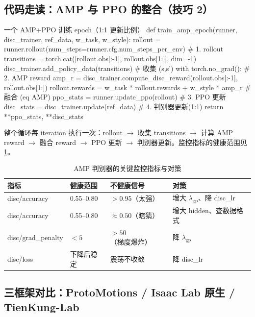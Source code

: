 \subsection{代码走读：AMP 与 PPO 的整合（技巧 2）}
\label{sec:rlmc-imit-amp-ppo}

\begin{codebox}[Python]{一个 AMP+PPO 训练 epoch（1:1 更新比例）}
def train_amp_epoch(runner, disc_trainer, ref_data, w_task, w_style):
    rollout = runner.rollout(num_steps=runner.cfg.num_steps_per_env)  # 1. rollout
    transitions = torch.cat([rollout.obs[:-1], rollout.obs[1:]], dim=-1)
    disc_trainer.add_policy_data(transitions)                          # 收集 (s,s')
    with torch.no_grad():                                              # 2. AMP reward
        amp_r = disc_trainer.compute_disc_reward(rollout.obs[:-1], rollout.obs[1:])
        rollout.rewards = w_task * rollout.rewards + w_style * amp_r   # 融合 (eq AMP)
    ppo_stats = runner.update_ppo(rollout)                            # 3. PPO 更新
    disc_stats = disc_trainer.update(ref_data)                        # 4. 判别器更新(1:1)
    return {**ppo_stats, **disc_stats}
\end{codebox}

整个循环每 iteration 执行一次：rollout $\to$ 收集 transitions $\to$ 计算 AMP reward $\to$ 融合 reward $\to$ PPO 更新 $\to$ 判别器更新。监控指标的健康范围见 \cref{tab:rlmc-imit-discmonitor}。

\begin{table}[ht]
\centering
\small
\caption{AMP 判别器的关键监控指标与对策}
\label{tab:rlmc-imit-discmonitor}
\begin{tabular}{@{}llll@{}}
\toprule
指标 & 健康范围 & 不健康信号 & 对策 \\
\midrule
disc/accuracy & 0.55--0.80 & $>0.95$（太强） & 增大 $\lambda_{\text{gp}}$、降 disc\_lr \\
disc/accuracy & 0.55--0.80 & $\approx0.50$（瞎猜） & 增大 hidden、查数据格式 \\
disc/grad\_penalty & $<5$ & $>50$（梯度爆炸） & 降 $\lambda_{\text{gp}}$ \\
disc/loss & 下降后稳定 & 震荡不收敛 & 降 disc\_lr \\
\bottomrule
\end{tabular}
\end{table}

\subsection{三框架对比：ProtoMotions / Isaac Lab 原生 / TienKung-Lab}
\label{sec:rlmc-imit-amp-three}

